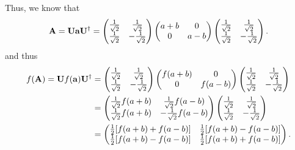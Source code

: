 \documentclass[a4paper]{book}
\newcounter{solution}[chapter]
\newcommand{\A}{{\bf A}}
\newcommand{\U}{{\bf U}}
\begin{document}
\begin{solution}
	Thus, we know that
	\[
		\A = \U {\bf a} \U^\dagger = \begin{pmatrix}
			\frac{1}{ \sqrt{2} } & \frac{1}{ \sqrt{2} } \\
			\frac{1}{ \sqrt{2} } & -\frac{1}{ \sqrt{2} }
		\end{pmatrix} \begin{pmatrix}
			a + b & 0 \\ 0 & a - b 
		\end{pmatrix} \begin{pmatrix}
			\frac{1}{ \sqrt{2} } & \frac{1}{ \sqrt{2} } \\
			\frac{1}{ \sqrt{2} } & -\frac{1}{ \sqrt{2} }
		\end{pmatrix} .
	\] 
	and thus
	\begin{align*}
		f(\A) = \U f( {\bf a} ) \U^\dagger &= \begin{pmatrix}
			\frac{1}{ \sqrt{2} } & \frac{1}{ \sqrt{2} } \\
			\frac{1}{ \sqrt{2} } & -\frac{1}{ \sqrt{2} }
		\end{pmatrix} \begin{pmatrix}
			f( a + b ) & 0 \\ 0 & f( a - b )
 		\end{pmatrix} \begin{pmatrix}
			\frac{1}{ \sqrt{2} } & \frac{1}{ \sqrt{2} } \\
			\frac{1}{ \sqrt{2} } & -\frac{1}{ \sqrt{2} }
		\end{pmatrix} \\
		&= \begin{pmatrix}
			\frac{1}{ \sqrt{2} } f( a + b ) & \frac{1}{ \sqrt{2} } f( a - b ) \\
			\frac{1}{ \sqrt{2} } f( a + b ) & -\frac{1}{ \sqrt{2} } f( a - b ) 
		\end{pmatrix} \begin{pmatrix}
			\frac{1}{ \sqrt{2} } & \frac{1}{ \sqrt{2} } \\
			\frac{1}{ \sqrt{2} } & -\frac{1}{ \sqrt{2} }
		\end{pmatrix} \\
		&= \begin{pmatrix}
		\frac{1}{2}[f(a+b)+f(a-b)] & \frac{1}{2}[f(a+b)-f(a-b)] \\
		\frac{1}{2}[f(a+b)-f(a-b)] & \frac{1}{2}[f(a+b)+f(a-b)]
		\end{pmatrix} .
	\end{align*}
	
	\end{solution}
	
\end{document}
